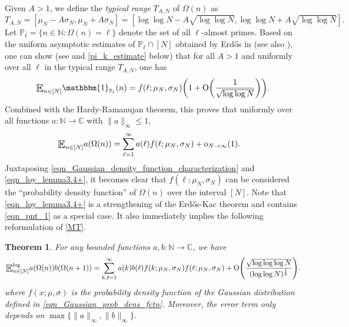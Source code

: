 \documentclass[letter,11pt]{article}
\theoremstyle{plain} %
\theoremstyle{definition} %
\theoremstyle{plain}
\newcounter{MainTheoremCounter}
\newtheorem{maintheorem}[MainTheoremCounter]{Theorem}
\theoremstyle{plain}
\theoremstyle{plain}
\numberwithin{equation}{section}
\newcommand{\Erdos}{Erd\H{o}s}
\newcommand{\Oh}{{\mathrm O}}
\newcommand{\oh}{{\mathrm o}}
\newcommand{\N}{\mathbb{N}}
\newcommand{\C}{\mathbb{C}}
\renewcommand{\leq}{\leqslant}
\renewcommand{\P}{\mathbb{P}}
\newcommand{\E}{\raisebox{-0.4ex}{\scalebox{1.4}[1.3]{$\mathbb{E}$}}}
\newcommand{\Esub}[1]{\raisebox{-0.4ex}{\scalebox{1.4}[1.3]{$\mathbb{E}$}}\raisebox{-0.35ex}{\ensuremath{_{\scriptstyle #1}}}}
\newcommand{\logE}{{\E}^{\log}}
\newcommand{\1}{\mathbbm{1}}
\begin{document}
Given $A>1$, we define the {\em typical range} $T_{A,N}$ of $\Omega(n)$ as
\begin{equation}\label{typical_range}
    T_{A,N} = [\mu_N-A\sigma_N,\mu_N+A\sigma_N] = [\log\log{N}-A\sqrt{\log\log{N}}, \log\log{N}+A\sqrt{\log\log{N}}].
\end{equation}
Let $\P_\ell=\{n\in\N: \Omega(n)=\ell\}$ denote the set of all $\ell$-almost primes.
Based on the uniform asymptotic estimates of $\P_\ell\cap[N]$ obtained by \Erdos{} in \cite{Erdos48a} (see also \cite{Selberge_Sathe}), one can show (see \cite[Lemma 3.4]{Loyd23} and \cref{pi_k_estimate} below) that for all $A>1$ and uniformly over all $\ell$ in the typical range $T_{A,N}$, one has
\begin{equation*}
\label{eqn_loy_lemma3.4}
\Esub{n\in[N]} \1_{\P_\ell}(n) = 
f(\ell;\mu_N,\sigma_N)\bigg(1 + \Oh\bigg(\frac{1}{\sqrt{\log\log{N}}}\bigg)\bigg).
\end{equation*}
Combined with the Hardy-Ramanujan theorem, this proves that uniformly over all functions $a\colon\N\to\C$ with $\|a\|_\infty\leq 1$,
\begin{align}
\label{eqn_loy_lemma3.4+}
\Esub{n\in[N]} a(\Omega(n))&=\sum_{\ell=1}^{\infty} a(\ell)f(\ell; \mu_N, \sigma_N)+\oh_{N\to\infty}(1).
\end{align}
Juxtaposing \eqref{eqn_Gaussian_density_function_characterization} and \eqref{eqn_loy_lemma3.4+}, it becomes clear that $f(\ell; \mu_N, \sigma_N)$ can be considered the ``probability density function'' of $\Omega(n)$ over the interval $[N]$.
Note that \eqref{eqn_loy_lemma3.4+} is a strengthening of the \Erdos{}-Kac theorem and contains \eqref{eqn_pnt_1} as a special case. It also immediately implies the following reformulation of \cref{MT}.

\begin{maintheorem}
\label{thm_B}
For any bounded functions $a,b\colon\N\to\C$, we have
\begin{equation*}
    \logE_{n\in[N]} a(\Omega(n))b(\Omega(n+1))
    =
    \sum_{k,\ell=1}^{\infty} a(k)b(\ell)f(k; \mu_N, \sigma_N) f(\ell; \mu_N, \sigma_N)
    + \Oh\Bigg(\frac{\sqrt{\log\log\log{N}}}{(\log\log{N})^\frac{1}{6}}\Bigg).
\end{equation*}
where $f(x;\mu,\sigma)$ is the probability density function of the Gaussian distribution defined in \eqref{eqn_Gaussian_prob_dens_fctn}.
Moreover, the error term only depends on $\max\{\|a\|_\infty,\|b\|_\infty\}$.
\end{maintheorem}
\end{document}
